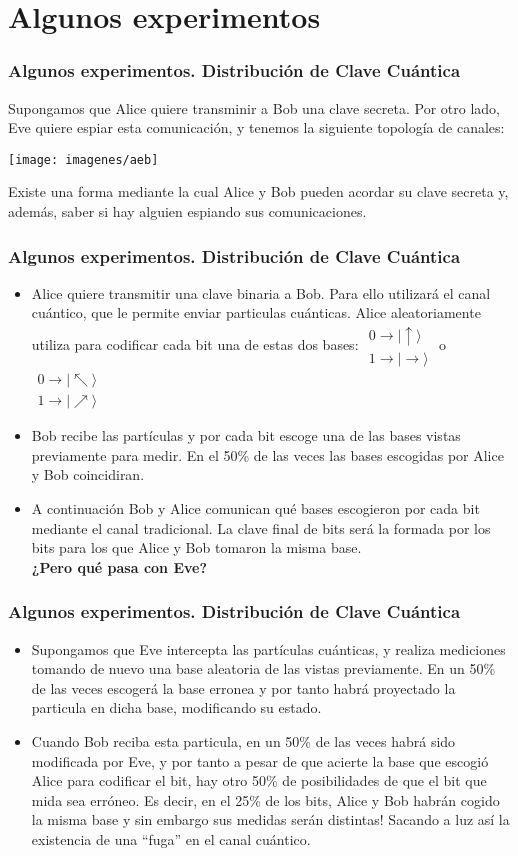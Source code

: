 \documentclass{beamer}
\newcommand{\filados}[2]{ \left. \begin{array}{c}	#1 \\	#2	 \end{array} \right. }
\newcommand{\baseup}{\mid\uparrow\rangle}
\newcommand{\baseright}{\mid\rightarrow\rangle}
\newcommand{\baseupright}{\mid\nearrow\rangle}
\newcommand{\baseupleft}{\mid\nwarrow\rangle}
\begin{document}
\section{Algunos experimentos}

\begin{frame}
	\frametitle{Algunos experimentos. Distribución de Clave Cuántica}
	Supongamos que Alice quiere transminir a Bob una clave secreta. Por otro lado, Eve quiere espiar esta comunicación, y tenemos la siguiente topología de canales:
	\begin{center}
	\texttt{[image: imagenes/aeb]}\\
	\end{center}
	Existe una forma mediante la cual Alice y Bob pueden acordar su clave secreta y, además, saber si hay alguien espiando sus comunicaciones.
\end{frame}

\begin{frame}
	\frametitle{Algunos experimentos. Distribución de Clave Cuántica}
	\begin{itemize}
	\item Alice quiere transmitir una clave binaria a Bob. Para ello utilizará el canal cuántico, que le permite enviar particulas cuánticas. Alice aleatoriamente utiliza para codificar cada bit una de estas dos bases: 
	$\filados{0\to\baseup}{1\to\baseright}$ o $\filados{0\to\baseupleft}{1\to\baseupright}$
	\item Bob recibe las partículas y por cada bit escoge una de las bases vistas previamente para medir. En el 50\% de las veces las bases escogidas por Alice y Bob coincidiran.
	\item A continuación Bob y Alice comunican qué bases escogieron por cada bit mediante el canal tradicional. La clave final de bits será la formada por los bits para los que Alice y Bob tomaron la misma base. \\ 
	\textbf{¿Pero qué pasa con Eve?}
	\end{itemize}
\end{frame}

\begin{frame}
	\frametitle{Algunos experimentos. Distribución de Clave Cuántica}
	\begin{itemize}
	\item Supongamos que Eve intercepta las partículas cuánticas, y realiza mediciones tomando de nuevo una base aleatoria de las vistas previamente. En un 50\% de las veces escogerá la base erronea y por tanto habrá proyectado la particula en dicha base, modificando su estado. 
	\item Cuando Bob reciba esta particula, en un 50\% de las veces habrá sido modificada por Eve, y por tanto a pesar de que acierte la base que escogió Alice para codificar el bit, hay otro 50\% de posibilidades de que el bit que mida sea erróneo. Es decir, en el 25\% de los bits, Alice y Bob habrán cogido la misma base y sin embargo sus medidas serán distintas! Sacando a luz así la existencia de una ``fuga'' en el canal cuántico.
	\end{itemize}
\end{frame}
\end{document}
